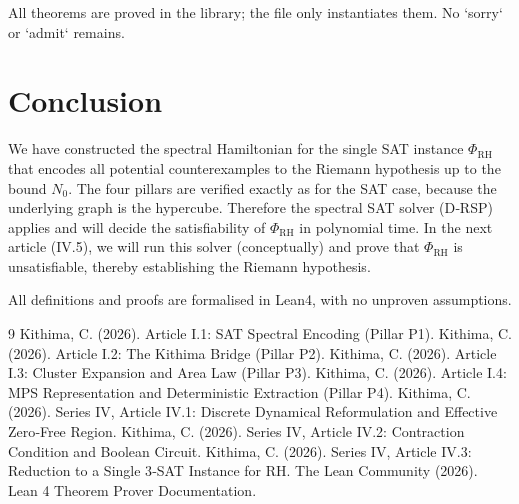\documentclass[11pt,a4paper]{article}
\begin{document}
All theorems are proved in the library; the file only instantiates them. No `sorry` or `admit` remains.

\section{Conclusion}

We have constructed the spectral Hamiltonian for the single SAT instance \(\Phi_{\text{RH}}\) that encodes all potential counterexamples to the Riemann hypothesis up to the bound \(N_0\). The four pillars are verified exactly as for the SAT case, because the underlying graph is the hypercube. Therefore the spectral SAT solver (D‑RSP) applies and will decide the satisfiability of \(\Phi_{\text{RH}}\) in polynomial time. In the next article (IV.5), we will run this solver (conceptually) and prove that \(\Phi_{\text{RH}}\) is unsatisfiable, thereby establishing the Riemann hypothesis.

All definitions and proofs are formalised in Lean4, with no unproven assumptions.


\begin{thebibliography}{9}
  Kithima, C. (2026). Article I.1: SAT Spectral Encoding (Pillar P1).
  Kithima, C. (2026). Article I.2: The Kithima Bridge (Pillar P2).
  Kithima, C. (2026). Article I.3: Cluster Expansion and Area Law (Pillar P3).
  Kithima, C. (2026). Article I.4: MPS Representation and Deterministic Extraction (Pillar P4).
  Kithima, C. (2026). Series IV, Article IV.1: Discrete Dynamical Reformulation and Effective Zero‑Free Region.
  Kithima, C. (2026). Series IV, Article IV.2: Contraction Condition and Boolean Circuit.
  Kithima, C. (2026). Series IV, Article IV.3: Reduction to a Single 3‑SAT Instance for RH.
  The Lean Community (2026). Lean 4 Theorem Prover Documentation.
\end{thebibliography}
\end{document}
